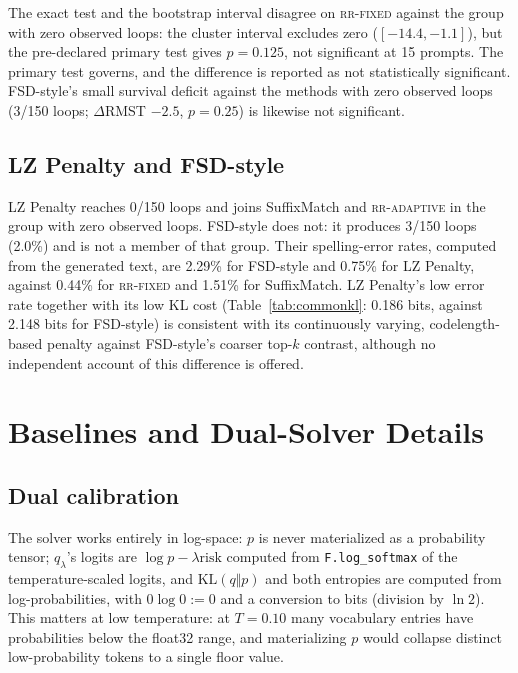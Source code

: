 \documentclass[11pt]{article}
\newcommand{\risk}{\mathrm{risk}}
\newcommand{\KL}{\mathrm{KL}}
\begin{document}
The exact test and the bootstrap interval disagree on \textsc{rr-fixed} against the group with zero observed loops: the cluster interval excludes zero ($[-14.4,-1.1]$), but the pre-declared primary test gives $p{=}0.125$, not significant at 15 prompts. The primary test governs, and the difference is reported as not statistically significant. FSD-style's small survival deficit against the methods with zero observed loops (3/150 loops; $\Delta$RMST $-2.5$, $p{=}0.25$) is likewise not significant.

\subsection{LZ Penalty and FSD-style}
\label{ssec:results-fsd-lz}
LZ Penalty reaches 0/150 loops and joins SuffixMatch and \textsc{rr-adaptive} in the group with zero observed loops. FSD-style does not: it produces 3/150 loops (2.0\%) and is not a member of that group. Their spelling-error rates, computed from the generated text, are 2.29\% for FSD-style and 0.75\% for LZ Penalty, against 0.44\% for \textsc{rr-fixed} and 1.51\% for SuffixMatch. LZ Penalty's low error rate together with its low KL cost (Table~\ref{tab:commonkl}: 0.186 bits, against 2.148 bits for FSD-style) is consistent with its continuously varying, codelength-based penalty against FSD-style's coarser top-$k$ contrast, although no independent account of this difference is offered.


\section{Baselines and Dual-Solver Details}
\label{app:baselines}

\subsection{Dual calibration}
\label{ssec:dual-fix}
The solver works entirely in log-space: $p$ is never materialized as a probability tensor; $q_\lambda$'s logits are $\log p-\lambda\risk$ computed from \texttt{F.log\_\allowbreak{}softmax} of the temperature-scaled logits, and $\KL(q\Vert p)$ and both entropies are computed from log-probabilities, with $0\log0:=0$ and a conversion to bits (division by $\ln2$). This matters at low temperature: at $T{=}0.10$ many vocabulary entries have probabilities below the float32 range, and materializing $p$ would collapse distinct low-probability tokens to a single floor value.
\end{document}

